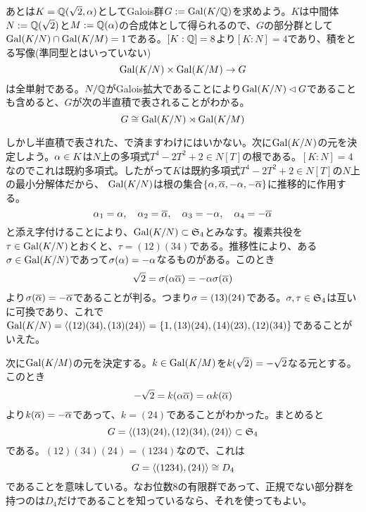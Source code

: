 \begin{sol}
あとは$K = {\mathbb Q}(\sqrt{2}, {\alpha})$としてGalois群$G := \operatorname{Gal}(K/{\mathbb Q})$を求めよう。$K$は中間体$N := {\mathbb Q}(\sqrt{2})$と$M := {\mathbb Q}({\alpha})$の合成体として得られるので、$G$の部分群として$\operatorname{Gal} (K/N) \cap \operatorname{Gal}(K/M) = 1$である。$[K:{\mathbb Q}] = 8$より$[K:N]=4$であり、積をとる写像(準同型とはいっていない)
\[
\operatorname{Gal} (K/N) \times \operatorname{Gal}(K/M) \to G
\]
は全単射である。$N/{\mathbb Q}$がGalois拡大であることにより$\operatorname{Gal}(K/N) \lhd G$であることも含めると、$G$が次の半直積で表されることがわかる。
\[
G \cong \operatorname{Gal} (K/N) \rtimes \operatorname{Gal}(K/M)
\]

しかし半直積で表された、で済ますわけにはいかない。次に$\operatorname{Gal}(K/N)$の元を決定しよう。${\alpha} \in K$は$N$上の多項式$T^4 - 2T^2 + 2 \in N[T]$の根である。$[K:N]=4$なのでこれは既約多項式。したがって$K$は既約多項式$T^4 - 2T^2 +2 \in N[T]$の$N$上の最小分解体だから、
$\operatorname{Gal}(K/N)$は根の集合$\{ {\alpha}, \overline{{\alpha}} , - {\alpha}, - \overline{{\alpha}} \}$に推移的に作用する。
\[
{\alpha}_1 = {\alpha} , \quad {\alpha}_2 = \overline{{\alpha}} , \quad {\alpha}_3 = - {\alpha} , \quad {\alpha}_4 = - \overline{{\alpha}}
\]
と添え字付けることにより、$\operatorname{Gal}(K/N) \subset \mathfrak{S}_4$とみなす。複素共役を$\tau \in \operatorname{Gal}(K/N)$とおくと、$\tau = (12)(34)$である。推移性により、ある${\sigma} \in \operatorname{Gal}(K/N)$であって${\sigma}({\alpha} ) = - {\alpha}$なるものがある。このとき
\[
\sqrt{2} = {\sigma}( {\alpha} \overline{{\alpha}} ) = - {\alpha}  {\sigma}(\overline{{\alpha}} )
\]
より${\sigma}( \overline{{\alpha}}) = - \overline{{\alpha}}$であることが判る。つまり${\sigma} = (13)(24)$である。${\sigma} , \tau \in \mathfrak{S}_4$は互いに可換であり、これで$\operatorname{Gal}(K/N) = \langle (12)(34) , (13)(24)  \rangle = \{ 1, (1 3)(2 4), (1  4)(2  3), (1  2)(3  4) \}$であることがいえた。

次に$\operatorname{Gal}(K/M)$の元を決定する。$k \in \operatorname{Gal}(K/M)$を$k(\sqrt{2}) = -\sqrt{2}$なる元とする。このとき
\[
- \sqrt{2} = k( {\alpha} \overline{{\alpha}}) = {\alpha} k( \overline{{\alpha}})
\]
より$k(\overline{{\alpha}}) = - \overline{{\alpha}}$であって、$k = (2 4)$であることがわかった。まとめると
\[
G = \langle  (1 3)(2 4), (1  2)(3  4) , (2 4)  \rangle \subset \mathfrak{S}_4
\]
である。$(12)(34)(24)=(1234)$なので、これは
\[
G = \langle  (1234), (24)  \rangle \cong D_4
\]
であることを意味している。なお位数$8$の有限群であって、正規でない部分群を持つのは$D_4$だけであることを知っているなら、それを使ってもよい。
\end{sol}


\newpage


